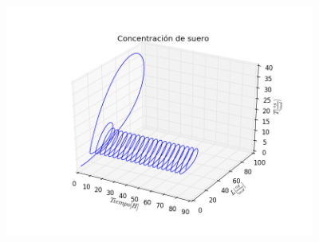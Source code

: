 \documentclass[10pt]{beamer}
\begin{document}
\begin{frame}
\begin{center}
 \includegraphics[width=4in]{imagenes/Graficas/g6_modelo2.png}
\end{center}
\end{frame}
\end{document}
